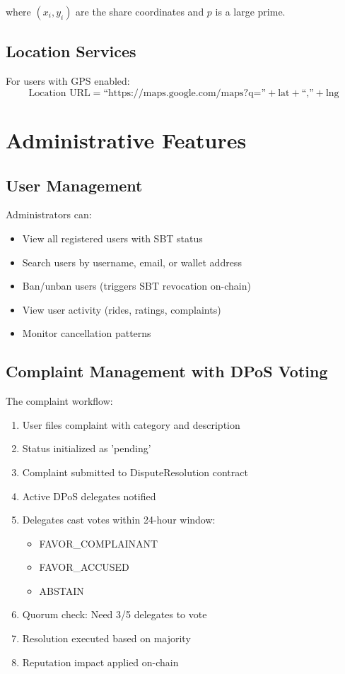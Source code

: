where $(x_i, y_i)$ are the share coordinates and $p$ is a large prime.

\subsection{Location Services}

For users with GPS enabled:
\begin{equation}
\text{Location URL} = \text{``https://maps.google.com/maps?q=''} + \text{lat} + \text{``,''} + \text{lng}
\end{equation}

\section{Administrative Features}

\subsection{User Management}

Administrators can:

\begin{itemize}
    \item View all registered users with SBT status
    \item Search users by username, email, or wallet address
    \item Ban/unban users (triggers SBT revocation on-chain)
    \item View user activity (rides, ratings, complaints)
    \item Monitor cancellation patterns
\end{itemize}

\subsection{Complaint Management with DPoS Voting}

The complaint workflow:

\begin{enumerate}
    \item User files complaint with category and description
    \item Status initialized as 'pending'
    \item Complaint submitted to DisputeResolution contract
    \item Active DPoS delegates notified
    \item Delegates cast votes within 24-hour window:
    \begin{itemize}
        \item FAVOR\_COMPLAINANT
        \item FAVOR\_ACCUSED  
        \item ABSTAIN
    \end{itemize}
    \item Quorum check: Need 3/5 delegates to vote
    \item Resolution executed based on majority
    \item Reputation impact applied on-chain
\end{enumerate}

